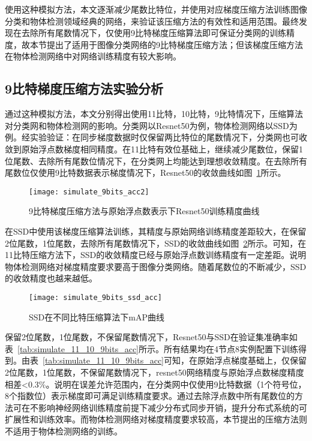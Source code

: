 使用这种模拟方法，本文逐渐减少尾数比特位，并使用对应梯度压缩方法训练图像分类和物体检测领域经典的网络，来验证该压缩方法的有效性和适用范围。最终发现在去除所有尾数情况下，仅使用9比特梯度压缩算法即可保证分类网的训练精度，故本节提出了适用于图像分类网络的9比特梯度压缩方法；但该梯度压缩方法在物体检测网络中对网络训练精度有较大影响。

\subsection{9比特梯度压缩方法实验分析}
通过这种模拟方法，本文分别得出使用11比特，10比特，9比特情况下，压缩算法对分类网和物体检测网的影响。分类网以Resnet50为例，物体检测网络以SSD为例。经实验验证：在同步梯度数据时仅保留两比特位的尾数情况下，分类网也可收敛到原始浮点数梯度相同精度。在11比特有效位基础上，继续减少尾数位，保留1位尾数、去除所有尾数位情况下，在分类网上均能达到理想收敛精度。在去除所有尾数位仅使用9比特数据表示梯度情况下，Resnet50的收敛曲线如图~\ref{fig:simulate_9bits_acc}所示。

\begin{figure}[htp]
\centering
\texttt{[image: simulate\_9bits\_acc2]}
\caption{9比特梯度压缩方法与原始浮点数表示下Resnet50训练精度曲线}
\label{fig:simulate_9bits_acc}
\end{figure}

在SSD中使用该梯度压缩算法训练，其精度与原始网络训练精度差距较大，在保留2位尾数，1位尾数，去除所有尾数情况下，SSD的收敛曲线如图~\ref{fig:simulate_9bits_ssd_acc}所示。可知，在11比特压缩方法下，SSD的收敛精度已经与原始浮点数训练精度有一定差距。说明物体检测网络对梯度精度要求要高于图像分类网络。随着尾数位的不断减少，SSD的收敛精度也越来越低。
\begin{figure}[htp]
\centering
\texttt{[image: simulate\_9bits\_ssd\_acc]}
\caption{SSD在不同比特压缩算法下mAP曲线}
\label{fig:simulate_9bits_ssd_acc}
\end{figure}

保留2位尾数，1位尾数，不保留尾数情况下，Resnet50与SSD在验证集准确率如表~\ref{tab:simulate_11_10_9bits_acc}所示。所有结果均在4节点8实例配置下训练得到。由表~\ref{tab:simulate_11_10_9bits_acc}可知，在原始浮点梯度基础上，仅保留2位尾数，1位尾数，不保留尾数情况下，resnet50网络精度与原始浮点数梯度精度相差<0.3\%。说明在误差允许范围内，在分类网中仅使用9比特数据（1个符号位，8个指数位）表示梯度即可满足训练精度要求。通过去除浮点数中所有尾数位的方法可在不影响神经网络训练精度前提下减少分布式同步开销，提升分布式系统的可扩展性和训练效率。而物体检测网络对梯度精度要求较高，本节提出的压缩方法则不适用于物体检测网络的训练。

